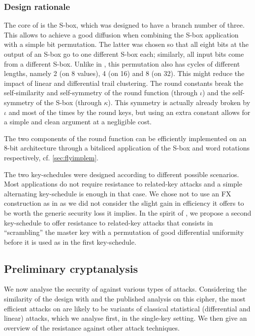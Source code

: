 \subsubsection*{Design rationale}
The core of \fly is the \littlunOne S-box, which was designed to have a branch number of three. This allows to achieve a good diffusion when combining the S-box
application with a simple bit permutation. The latter was chosen so that all eight bits at the output of an S-box go to one different S-box each; similarly, all
input bits come from a different S-box. Unlike in \present, this permutation also has cycles of different lengths,
namely 2 (on 8 values), 4 (on 16) and 8 (on 32). This might reduce the impact of linear and differential trail clustering.
The round constants break the self-similarity and self-symmetry of the round function (through $\iota$)
and the self-symmetry of the S-box (through $\kappa$). This symmetry is actually already broken by $\iota$ and most of the times by the round keys, but using an
extra constant allows for a simple and clean argument at a negligible cost.

The two components of the round function can be efficiently implemented on an 8-bit architecture through a bitsliced
application of the S-box and word rotations respectively, cf. \autoref{sec:flyimplem}.

The two key-schedules were designed according to different possible scenarios. Most applications do not require resistance to related-key attacks and a simple
alternating key-schedule is enough in that case. We chose not to use an FX construction as in \pride as we did not consider the slight gain in efficiency
it offers to be worth the generic security loss it implies. In the spirit of \noekeon, we propose a second key-schedule to offer resistance to related-key attacks
that consists in ``scrambling'' the master key with a permutation of good differential uniformity before it is used as in the first key-schedule.

\subsection{Preliminary cryptanalysis}

We now analyse the security of \fly against various types of attacks. Considering the similarity of the design with \present and the published analysis on this cipher, the
most efficient attacks on \fly are likely to be variants of classical statistical (differential and linear) attacks, which we analyse first, in the single-key setting.
We then give an overview of the resistance against other attack techniques.

